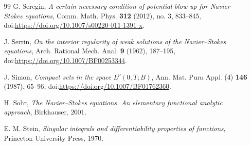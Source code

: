 \documentclass[11pt]{amsart}
\theoremstyle{plain}
\theoremstyle{definition}
\theoremstyle{remark}
\numberwithin{equation}{section}
\begin{document}
\begin{thebibliography}{99}
G. Seregin,
\emph{A certain necessary condition of potential blow up for Navier--Stokes equations},
Comm. Math. Phys. \textbf{312} (2012), no. 3, 833--845,
doi:\url{https://doi.org/10.1007/s00220-011-1391-x}.

J. Serrin,
\emph{On the interior regularity of weak solutions of the Navier--Stokes equations},
Arch. Rational Mech. Anal. \textbf{9} (1962), 187--195,
doi:\url{https://doi.org/10.1007/BF00253344}.

J. Simon,
\emph{Compact sets in the space \(L^p(0,T;B)\)},
Ann. Mat. Pura Appl. (4) \textbf{146} (1987), 65--96,
doi:\url{https://doi.org/10.1007/BF01762360}.

H. Sohr,
\emph{The Navier--Stokes equations. An elementary functional analytic approach},
Birkhauser, 2001.

E. M. Stein,
\emph{Singular integrals and differentiability properties of functions},
Princeton University Press, 1970.

\end{thebibliography}
\end{document}
